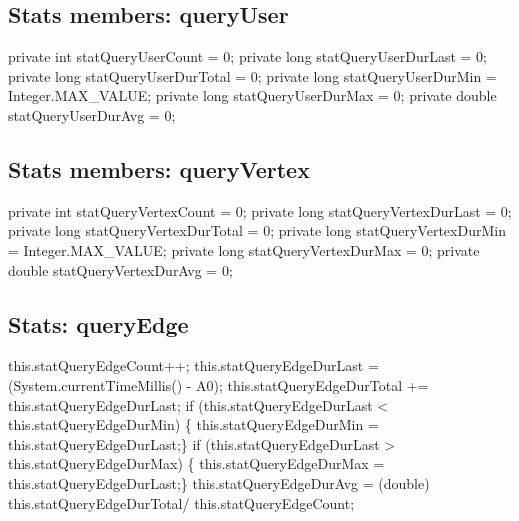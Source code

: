 \subsection{Stats members: queryUser}
\nwenddocs{}\endmoddef{}
private int    statQueryUserCount    = 0;
private long   statQueryUserDurLast  = 0;
private long   statQueryUserDurTotal = 0;
private long   statQueryUserDurMin   = Integer.MAX_VALUE;
private long   statQueryUserDurMax   = 0;
private double statQueryUserDurAvg   = 0;
\nwendcode{}\nwdocspar

\subsection{Stats members: queryVertex}
\nwenddocs{}\endmoddef{}
private int    statQueryVertexCount    = 0;
private long   statQueryVertexDurLast  = 0;
private long   statQueryVertexDurTotal = 0;
private long   statQueryVertexDurMin   = Integer.MAX_VALUE;
private long   statQueryVertexDurMax   = 0;
private double statQueryVertexDurAvg   = 0;
\nwendcode{}\nwdocspar

\subsection{Stats: queryEdge}
\nwenddocs{}\endmoddef{}
    this.statQueryEdgeCount++;
    this.statQueryEdgeDurLast = (System.currentTimeMillis() - A0);
    this.statQueryEdgeDurTotal +=
    this.statQueryEdgeDurLast;
if (this.statQueryEdgeDurLast <
    this.statQueryEdgeDurMin) \{
    this.statQueryEdgeDurMin =
    this.statQueryEdgeDurLast;\}
if (this.statQueryEdgeDurLast >
    this.statQueryEdgeDurMax) \{
    this.statQueryEdgeDurMax =
    this.statQueryEdgeDurLast;\}
    this.statQueryEdgeDurAvg = (double)
    this.statQueryEdgeDurTotal/
    this.statQueryEdgeCount;
\nwendcode{}\nwdocspar

